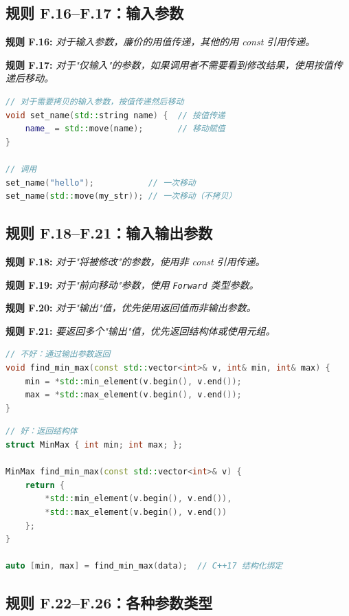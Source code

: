 \subsection{规则 F.16--F.17：输入参数}

\textbf{规则 F.16:} \textit{对于输入参数，廉价的用值传递，其他的用 const 引用传递。}

\textbf{规则 F.17:} \textit{对于"仅输入"的参数，如果调用者不需要看到修改结果，使用按值传递后移动。}

\begin{lstlisting}[language=C++]
// 对于需要拷贝的输入参数，按值传递然后移动
void set_name(std::string name) {  // 按值传递
    name_ = std::move(name);       // 移动赋值
}

// 调用
set_name("hello");           // 一次移动
set_name(std::move(my_str)); // 一次移动（不拷贝）
\end{lstlisting}

\subsection{规则 F.18--F.21：输入输出参数}

\textbf{规则 F.18:} \textit{对于"将被修改"的参数，使用非 const 引用传递。}

\textbf{规则 F.19:} \textit{对于"前向移动"参数，使用 \texttt{Forward} 类型参数。}

\textbf{规则 F.20:} \textit{对于"输出"值，优先使用返回值而非输出参数。}

\textbf{规则 F.21:} \textit{要返回多个"输出"值，优先返回结构体或使用元组。}

\begin{lstlisting}[language=C++]
// 不好：通过输出参数返回
void find_min_max(const std::vector<int>& v, int& min, int& max) {
    min = *std::min_element(v.begin(), v.end());
    max = *std::max_element(v.begin(), v.end());
}
\end{lstlisting}

\begin{lstlisting}[language=C++]
// 好：返回结构体
struct MinMax { int min; int max; };

MinMax find_min_max(const std::vector<int>& v) {
    return {
        *std::min_element(v.begin(), v.end()),
        *std::max_element(v.begin(), v.end())
    };
}

auto [min, max] = find_min_max(data);  // C++17 结构化绑定
\end{lstlisting}

\subsection{规则 F.22--F.26：各种参数类型}

